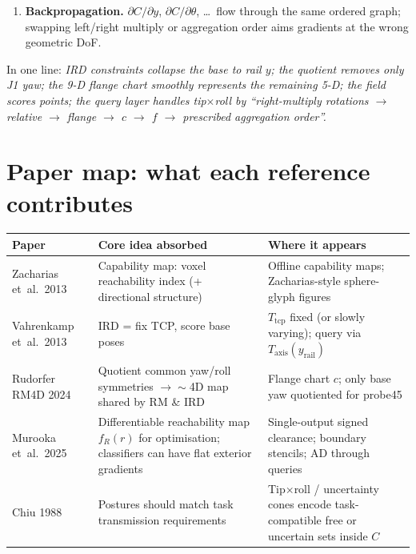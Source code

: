 \documentclass[11pt,a4paper]{article}
\newcommand{\Tcp}{T_{\mathrm{tcp}}}
\newcommand{\Taxis}{T_{\mathrm{axis}}}
\begin{document}
\begin{enumerate}[leftmargin=1.6em]
\begin{itemize}[leftmargin=1.2em]
          \item If Region~A uncertainty wraps freedom: for each free sample
                \(\eta_{k}\), softmin/CVaR over uncertain \(\delta_{j}\) first,
                then softmax / mean over \(k\) (Eq.~\eqref{eq:set-query}:
                \emph{uncertainty before freedom}).
          \item Trajectories: softmin over waypoints/path samples next
                (Section~\ref{sec:agg-order}).
        \end{itemize}
  \item \textbf{Backpropagation.}
        \(\partial C/\partial y\), \(\partial C/\partial\theta\), \ldots\ flow through
        the same ordered graph; swapping left/right multiply or aggregation
        order aims gradients at the wrong geometric DoF.
\end{enumerate}

In one line:
\emph{IRD constraints collapse the base to rail \(y\); the quotient removes only
J1 yaw; the 9-D flange chart smoothly represents the remaining 5-D; the field
scores points; the query layer handles tip$\times$roll by
``right-multiply rotations \(\to\) relative \(\to\) flange \(\to\) \(c\) \(\to\) \(f\) \(\to\)
prescribed aggregation order''.}

\section{Paper map: what each reference contributes}
\label{sec:papers}

\begin{table}[h]
\centering
\begin{tabular}{@{}llp{6.6cm}@{}}
\toprule
Paper & Core idea absorbed & Where it appears \\
\midrule
Zacharias et~al.\ 2013
  & Capability map: voxel reachability index (+ directional structure)
  & Offline capability maps; Zacharias-style sphere-glyph figures \\
Vahrenkamp et~al.\ 2013
  & IRD = fix TCP, score base poses
  & \(\Tcp\) fixed (or slowly varying); query via \(\Taxis(y_{\mathrm{rail}})\) \\
Rudorfer RM4D 2024
  & Quotient common yaw/roll symmetries $\to\sim$4D map shared by RM \& IRD
  & Flange chart \(c\); only base yaw quotiented for probe45 \\
Murooka et~al.\ 2025
  & Differentiable reachability map \(f_{R}(r)\) for optimisation;
    classifiers can have flat exterior gradients
  & Single-output signed clearance; boundary stencils; AD through queries \\
Chiu 1988
  & Postures should match task transmission requirements
  & Tip$\times$roll / uncertainty cones encode task-compatible free or
    uncertain sets inside \(C\) \\
\bottomrule
\end{tabular}
\end{table}
\end{document}
